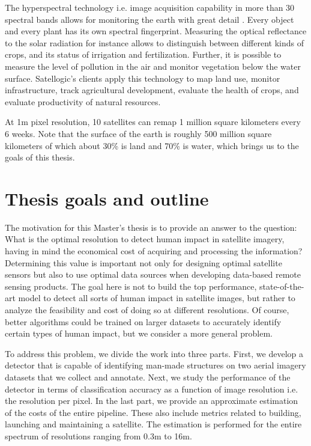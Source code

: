 The hyperspectral technology i.e. image acquisition capability in more than 30 spectral bands allows for monitoring the earth with great detail \parencite{satellogic2019}. Every object and every plant has its own spectral fingerprint. Measuring the optical reflectance to the solar radiation for instance allows to distinguish between different kinds of crops, and its status of irrigation and fertilization. Further, it is possible to measure the level of pollution in the air and monitor vegetation below the water surface. Satellogic's clients apply this technology to map land use, monitor infrastructure, track agricultural development, evaluate the health of crops, and evaluate productivity of natural resources.

At 1m pixel resolution, 10 satellites can remap 1 million square kilometers every 6 weeks. Note that the surface of the earth is roughly 500 million square kilometers of which about 30\% is land and 70\% is water, which brings us to the goals of this thesis.


\section{Thesis goals and outline}
The motivation for this Master's thesis is to provide an answer to the question: What is the optimal resolution to detect human impact in satellite imagery, having in mind the economical cost of acquiring and processing the information? 
Determining this value is important not only for designing optimal satellite sensors but also to use optimal data sources when developing data-based remote sensing products. The goal here is not to build the top performance, state-of-the-art model to detect all sorts of human impact in satellite images, but rather to analyze the feasibility and cost of doing so at different resolutions. Of course, better algorithms could be trained on larger datasets to accurately identify certain types of human impact, but we consider a more general problem.

To address this problem, we divide the work into three parts. First, we develop a detector that is capable of identifying man-made structures on two aerial imagery datasets that we collect and annotate. Next, we study the performance of the detector in terms of classification accuracy as a function of image resolution i.e. the resolution per pixel. In the last part, we provide an approximate estimation of the costs of the entire pipeline. These also include metrics related to building, launching and maintaining a satellite. The estimation is performed for the entire spectrum of resolutions ranging from 0.3m to 16m.

